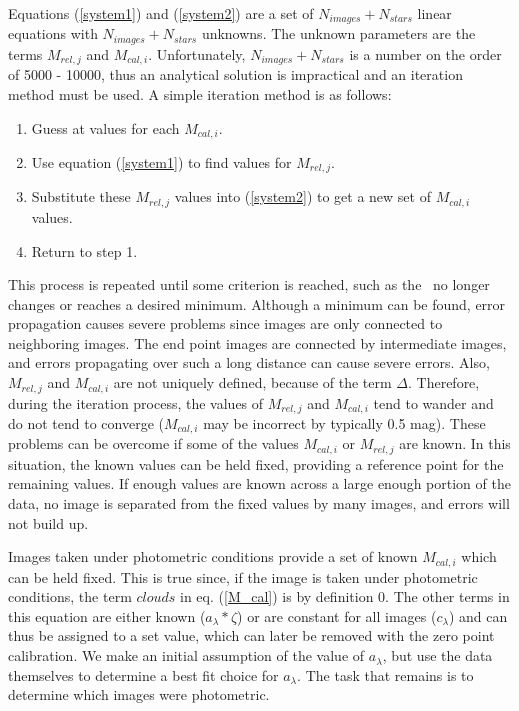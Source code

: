 \documentclass{article}
\begin{document}
        Equations (\ref{system1}) and (\ref{system2}) are a set of
$N_{images} + N_{stars}$ linear equations with $N_{images} +
N_{stars}$ unknowns.  The unknown parameters are the terms $M_{rel,j}$
and $M_{cal,i}$.  Unfortunately, $N_{images} + N_{stars}$ is a number
on the order of 5000 - 10000, thus an analytical solution is
impractical and an iteration method must be used.  A simple iteration
method is as follows:

\begin{enumerate}
\setlength{\parskip}{-0.05in}
\item Guess at values for each $M_{cal,i}$.
\item Use equation (\ref{system1}) to find values for $M_{rel,j}$.  
\item Substitute these $M_{rel,j}$ values into (\ref{system2}) to get a new
set of $M_{cal,i}$ values.  
\item Return to step 1.
\end{enumerate}
This process is repeated until some criterion is reached, such as the
\chisq\ no longer changes or reaches a desired minimum.  Although a
minimum can be found, error propagation causes severe problems
since images are only connected to neighboring images.  The end point
images are connected by  intermediate images, and errors
propagating over such a long distance can cause severe errors.  Also,
$M_{rel,j}$ and $M_{cal,i}$ are not uniquely defined, because of the
term $\Delta$.  Therefore, during the iteration process, the values of
$M_{rel,j}$ and $M_{cal,i}$ tend to wander and do not tend to converge
($M_{cal,i}$ may be incorrect by typically 0.5 mag).  These problems
can be overcome if some of the values $M_{cal,i}$ or $M_{rel,j}$ are
known.  In this situation, the known values can be held fixed,
providing a reference point for the remaining values.  If enough
values are known across a large enough portion of the data, no image
is separated from the fixed values by many images, and errors will not
build up.

        Images taken under photometric conditions provide a set of
known $M_{cal,i}$ which can be held fixed.  This is true since, if the
image is taken under photometric conditions, the term $clouds$ in eq.
(\ref{M_cal}) is by definition 0.  The other terms in this equation
are either known ($a_{\lambda}*\zeta$) or are constant for all images
($c_{\lambda}$) and can thus be assigned to a set value, which can
later be removed with the zero point calibration.  We make an initial
assumption of the value of $a_\lambda$, but use the data themselves to
determine a best fit choice for $a_\lambda$.  The task that remains is
to determine which images were photometric.
\end{document}
